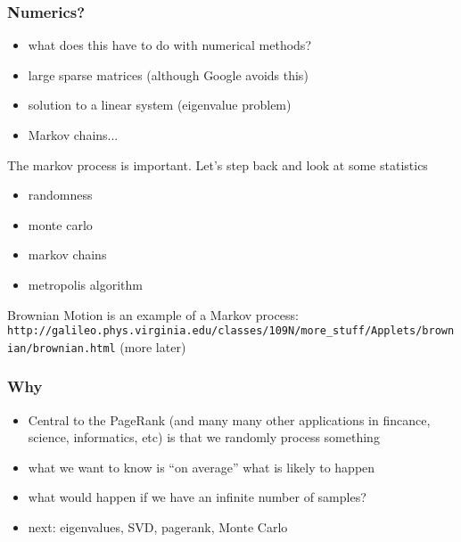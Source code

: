\documentclass[10pt]{beamer}
\begin{document}
\begin{frame}
\frametitle{Numerics?}
\begin{itemize}
  \item what does this have to do with numerical methods?
  \item large sparse matrices (although Google avoids this)
  \item solution to a linear system (eigenvalue problem)
  \item Markov chains...
\end{itemize}
The markov process is important.  Let's step back and look at some
statistics
\begin{itemize}
  \item randomness
  \item monte carlo
  \item markov chains
  \item metropolis algorithm
\end{itemize}
Brownian Motion is an example of a Markov process:
\texttt{http://galileo.phys.virginia.edu/classes/109N/more\_stuff/Applets/brownian/brownian.html} (more later)
\end{frame}
\begin{frame}
\frametitle{Why}
\begin{itemize}
  \item Central to the PageRank (and many many other applications in
fincance, science, informatics, etc) is that we randomly process
something
  \item what we want to know is ``on average'' what is likely to happen
  \item what would happen if we have an infinite number of samples?
  \item next: eigenvalues, SVD, pagerank, Monte Carlo
\end{itemize}
\end{frame}
\end{document}
